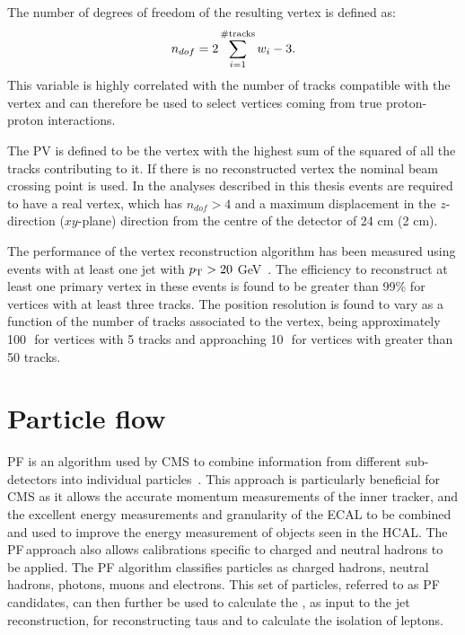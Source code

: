 The number of degrees of freedom of the resulting vertex is defined as:
\begin{equation}
  \label{eq:vertdof}
  n_{dof}=2\displaystyle\sum_{i=1}^{\# \rm{tracks}}w_i -3.
\end{equation}
This variable is highly correlated with the number of tracks compatible with the vertex and can therefore be used to select vertices coming from true proton-proton interactions.

The \ac{PV} is defined to be the vertex with the highest sum of the squared \pt of all the tracks contributing to it. If there is no reconstructed vertex the nominal beam crossing point is used. In the analyses described in this thesis events are required to have a real vertex, which has $n_{dof}>4$ and a maximum displacement in the $z$-direction ($xy$-plane) direction from the centre of the detector of 24 cm (2 cm).

The performance of the vertex reconstruction algorithm has been measured using events with at least one jet with $p_{\mathrm{T}}>20$ GeV~\cite{1748-0221-9-10-P10009}. The efficiency to reconstruct at least one primary vertex in these events is found to be greater than 99\% for vertices with at least three tracks. The position resolution is found to vary as a function of the number of tracks associated to the vertex, being approximately 100\,\micron\, for vertices with 5 tracks and approaching 10\,\micron\, for vertices with greater than 50 tracks.

\section{Particle flow}
\label{sec:pf}
\ac{PF} is an algorithm used by CMS to combine information from different sub-detectors into individual particles~\cite{CMS-PAS-PFT-09-001,CMS-PAS-PFT-10-001,CMS-PAS-PFT-10-002}. This approach is particularly beneficial for CMS as it allows the accurate momentum measurements of the inner tracker, and the excellent energy measurements and granularity of the \ac{ECAL} to be combined and used to improve the energy measurement of objects seen in the \ac{HCAL}. The \ac{PF}\,approach also allows calibrations specific to charged and neutral hadrons to be applied. The \ac{PF} algorithm classifies particles as charged hadrons, neutral hadrons, photons, muons and electrons. This set of particles, referred to as \ac{PF} candidates, can then further be used to calculate the \MET, as input to the jet reconstruction, for reconstructing taus and to calculate the isolation of leptons.

